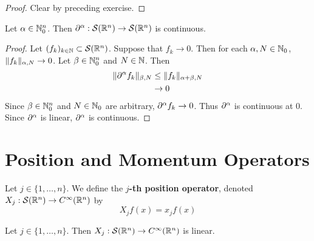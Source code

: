 \documentclass{book}
\begin{document}
	\begin{proof}
		Clear by preceding exercise.
	\end{proof}

	\begin{ex} 
		Let $\alpha \in \mathbb{N}_0^n$. Then $\partial^{\alpha}: \mathcal{S}(\mathbb{R}^n) \rightarrow \mathcal{S}(\mathbb{R}^n)$ is continuous.
	\end{ex}

	\begin{proof}
			Let $(f_k)_{k \in \mathbb{N}} \subset \mathcal{S}(\mathbb{R}^n)$. Suppose that $f_k \rightarrow 0$. Then for each $\alpha, N \in \mathbb{N}_0$, $\|f_k\|_{\alpha, N} \rightarrow 0$. Let $\beta \in \mathbb{N}_0^n$ and $N \in \mathbb{N}$. Then
		\begin{align*}
			\|\partial^{\alpha}f_k\|_{\beta, N} 
			& \leq \|f_k \|_{\alpha + \beta, N} \\
			& \rightarrow 0
		\end{align*}
		Since $\beta \in \mathbb{N}_0^n$ and $N \in \mathbb{N}_0$ are arbitrary, $\partial^{\alpha}f_k \rightarrow 0$. Thus $\partial^{\alpha}$ is continuous at $0$. Since $\partial^{\alpha}$ is linear, $\partial^{\alpha}$ is continuous. 
	\end{proof}




































	\newpage
	\section{Position and Momentum Operators}
	
	\begin{defn} 
		Let $j \in \{1, \ldots, n\}$. We define the \textbf{$j$-th position operator}, denoted $X_j: \mathcal{S}(\mathbb{R}^n) \rightarrow C^{\infty}(\mathbb{R}^n)$ by 
		$$X_jf(x) = x_j f(x)$$
	\end{defn}

	\begin{ex} 
		Let $j \in \{1, \ldots, n\}$. Then $X_j: \mathcal{S}(\mathbb{R}^n) \rightarrow C^{\infty}(\mathbb{R}^n)$ is linear.
	\end{ex}
\end{document}
